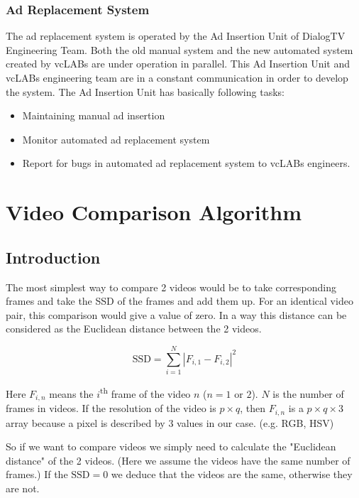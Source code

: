 \subsubsection{Ad Replacement System}

The ad replacement system is operated by the Ad Insertion Unit of DialogTV Engineering Team. Both the old manual system and the new automated system created by vcLABs are under operation in parallel. This Ad Insertion Unit and vcLABs engineering team are in a constant communication in order to develop the system. The Ad Insertion Unit has basically following tasks:

\begin{itemize}
\item Maintaining manual ad insertion
\item Monitor automated ad replacement system
\item Report for bugs in automated ad replacement system to vcLABs engineers.
\end{itemize}

\section{Video Comparison Algorithm}

\subsection{Introduction}
The most simplest way to compare 2 videos would be to take corresponding frames and take the SSD of the frames and add them up. For an identical video pair, this comparison would give a value of zero. In a way this distance can be considered as the Euclidean distance between the 2 videos.

\begin{equation}
\text{SSD}=\sum_{i=1}^N |F_{i,1}-F_{i,2}|^2
\end{equation}

Here $F_{i,n}$ means the $i$\textsuperscript{th} frame of the video $n$ ($n=1\text{ or } 2$). $N$ is the number of frames in videos. If the resolution of the video is $p\times q$, then $F_{i,n}$ is a $p\times q \times 3$ array because a pixel is described by $3$ values in our case. (e.g. RGB, HSV) 

So if we want to compare videos we simply need to calculate the "Euclidean distance" of the 2 videos. (Here we assume the videos have the same number of frames.) If the $\text{SSD}=0$ we deduce that the videos are the same, otherwise they are not.

